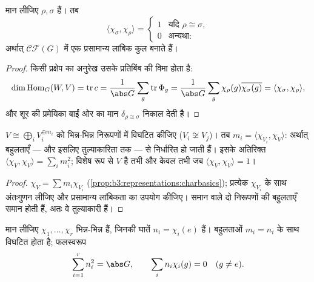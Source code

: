 \begin{theorem}[प्रथम लांबिकता संबंध]
\label{thm:b3:representations:orthogonality}
मान लीजिए $\rho, \sigma$ \emph{} हैं। तब
\[
\langle\chi_\sigma, \chi_\rho\rangle =
\begin{cases}
1 & \text{यदि } \rho \cong \sigma,\\
0 & \text{अन्यथा:}
\end{cases}
\]
अर्थात्   $\mathcal{CF}(G)$ में एक प्रसामान्य लांबिक कुल बनाते
हैं।
\end{theorem}

\begin{proof}
किसी प्रक्षेप का अनुरेख उसके प्रतिबिंब की विमा होता है:
\[
\dim\operatorname{Hom}_G(W, V) = \operatorname{tr} c
= \frac1{\abs G}\sum_g \operatorname{tr}\Phi_g
= \frac1{\abs G}\sum_g \chi_\rho(g)\overline{\chi_\sigma(g)}
= \langle \chi_\sigma, \chi_\rho\rangle,
\]
और शूर की प्रमेयिका बाईं ओर का मान $\delta_{\rho \cong
\sigma}$ निकाल देती है।
\end{proof}

\begin{corollary}\label{cor:b3:representations:multiplicity}
$V \cong \bigoplus_i V_i^{\oplus m_i}$ को भिन्न-भिन्न  निरूपणों में विघटित कीजिए ($V_i \not\cong V_j$)।
तब $m_i = \langle
\chi_{V_i}, \chi_V\rangle$: अर्थात् बहुलताएँ --- और इसलिए तुल्याकारिता तक 
---  से निर्धारित हो जाती हैं। इसके अतिरिक्त $\langle \chi_V, \chi_V\rangle = \sum_i
m_i^2$; विशेष रूप
से $V$  है तभी और केवल तभी जब $\langle\chi_V,
\chi_V\rangle = 1$।
\end{corollary}

\begin{proof}
$\chi_V = \sum m_i\chi_{V_i}$ (\cref{prop:b3:representations:charbasics}); प्रत्येक $\chi_{V_i}$ के साथ अंतःगुणन लीजिए और प्रसामान्य
लांबिकता का उपयोग कीजिए। समान  वाले दो निरूपणों की बहुलताएँ
समान होती हैं, अतः वे तुल्याकारी हैं।
\end{proof}

\begin{theorem}[नियमित निरूपण]
\label{thm:b3:representations:regular}
मान लीजिए $\chi_1, \dots, \chi_r$ भिन्न-भिन्न   हैं, जिनकी घातें $n_i = \chi_i(e)$
हैं।  बहुलताओं $m_i = n_i$ के साथ विघटित होता है;
फलस्वरूप
\[
\sum_{i=1}^{r} n_i^2 = \abs G,
\qquad
\sum_i n_i\chi_i(g) = 0 \quad (g \neq e).
\]
\end{theorem}

